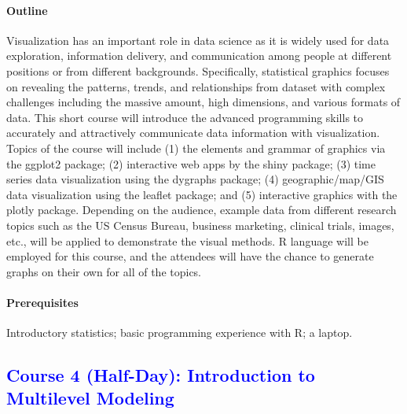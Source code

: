 \documentclass[11pt]{article}
\newcommand{\blue}[1]{{\textcolor{blue}{#1}}}
\newcommand{\pkg}[1]{{\normalfont\fontseries{b}\selectfont #1}}
\begin{document}
\paragraph{Outline}
Visualization has an important role in data science as it is widely
used for data exploration, information delivery, and communication
among people at different positions or from different
backgrounds. Specifically, statistical graphics focuses on revealing
the patterns, trends, and relationships from dataset with complex
challenges including the massive amount, high dimensions, and various
formats of data. This short course will introduce the advanced
programming skills to accurately and attractively communicate data
information with visualization. Topics of the course will include (1)
the elements and grammar of graphics via the \pkg{ggplot2} package;
(2) interactive web apps by the \pkg{shiny} package; (3) time series data
visualization using the \pkg{dygraphs} package; (4) geographic/map/GIS data
visualization using the \pkg{leaflet} package; and (5) interactive graphics with
the \pkg{plotly} package. Depending on the audience, example data from
different research topics such as the US Census Bureau, business
marketing, clinical trials, images, etc., will be applied to
demonstrate the visual methods. R language will be employed for this
course, and the attendees will have the chance to generate graphs on
their own for all of the topics.

\paragraph{Prerequisites}
Introductory statistics; basic programming experience with R; a laptop.

\subsection*{\blue{Course 4 (Half-Day): Introduction to Multilevel Modeling}}
\end{document}
